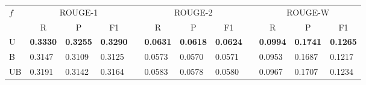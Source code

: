  \setlength{\tabcolsep}{5pt}
\begin{tabular*}{\textwidth}{@{\extracolsep{\fill}}llllllllllll} 
\hline \hline
\multirow{2}{*}{$ f $}	& \multicolumn{3}{c}{ROUGE-1}	&& \multicolumn{3}{c}{ROUGE-2}	&& \multicolumn{3}{c}{ROUGE-W} \\
\cline{2-4} \cline{6-8} \cline{10-12}
	& \multicolumn{1}{c}{R}		& \multicolumn{1}{c}{P}	& \multicolumn{1}{c}{F1}	&& \multicolumn{1}{c}{R}	& \multicolumn{1}{c}{P}	& \multicolumn{1}{c}{F1}	&& \multicolumn{1}{c}{R}	& \multicolumn{1}{c}{P}	& \multicolumn{1}{c}{F1}\\
\hline
U	& \textbf{0.3330}	& \textbf{0.3255}	& \textbf{0.3290}	&& \textbf{0.0631}	& \textbf{0.0618}	& \textbf{0.0624}	&& \textbf{0.0994}	& \textbf{0.1741}	& \textbf{0.1265} \\
B	& 0.3147	& 0.3109	& 0.3125	&& 0.0573	& 0.0570	& 0.0571	&& 0.0953	& 0.1687	& 0.1217 \\
UB	& 0.3191	& 0.3142	& 0.3164	&& 0.0583	& 0.0578	& 0.0580	&& 0.0967	& 0.1707	& 0.1234 \\
\hline \hline
\end{tabular*}

